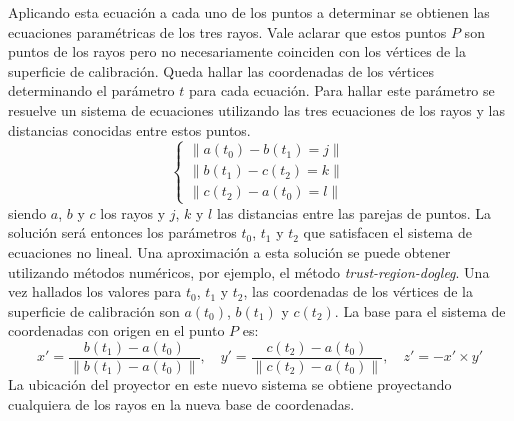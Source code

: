 Aplicando esta ecuación a cada uno de los puntos a determinar se obtienen las ecuaciones paramétricas de los tres rayos. Vale aclarar que estos puntos $P$ son puntos de los rayos pero no necesariamente coinciden con los vértices de la superficie de calibración. Queda hallar las coordenadas de los vértices determinando el parámetro $t$ para cada ecuación. Para hallar este parámetro se resuelve un sistema de ecuaciones utilizando las tres ecuaciones de los rayos y las distancias conocidas entre estos puntos.
\[
\begin{cases}
\lVert{a(t_0) - b(t_1)} = j\rVert \\
\lVert{b(t_1) - c(t_2)} = k\rVert \\
\lVert{c(t_2) - a(t_0)} = l\rVert
\end{cases}
\]
siendo $a$, $b$ y $c$ los rayos y $j$, $k$ y $l$ las distancias entre las parejas de puntos.
La solución será entonces los parámetros $t_0$, $t_1$ y $t_2$ que satisfacen el sistema de ecuaciones no lineal.
Una aproximación a esta solución se puede obtener utilizando métodos numéricos, por ejemplo, el método \emph{trust-region-dogleg}\cite{TrustRegionDogleg}.
Una vez hallados los valores para $t_0$, $t_1$ y $t_2$, las coordenadas de los vértices de la superficie de calibración son $a(t_0)$, $b(t_1)$ y $c(t_2)$.
La base para el sistema de coordenadas con origen en el punto $P$ es:
\[
x' = \frac{b(t_1) - a(t_0)}{\lVert b(t_1) - a(t_0) \rVert},\quad y' = \frac{c(t_2) - a(t_0)}{\lVert c(t_2) - a(t_0)\rVert},\quad z' = -x' \times y'
\]
La ubicación del proyector en este nuevo sistema se obtiene proyectando cualquiera de los rayos en la nueva base de coordenadas.